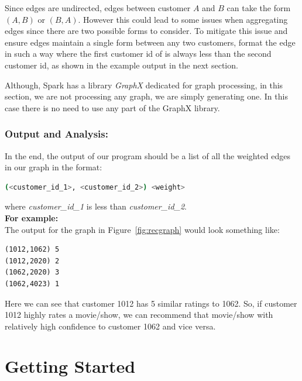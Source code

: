 \documentclass{article}
\begin{document}
\begin{info}
Since edges are undirected, edges between customer $A$ and $B$ can take the form $(A,B)$ or $(B,A)$. However this could lead to some issues when aggregating edges since there are two possible forms to consider. To mitigate this issue and ensure edges maintain a single form between any two customers, format the edge in such a way where the first customer id of is always less than the second customer id, as shown in the example output in the next section. 
\end{info}

\vspace{-0.5cm}

\begin{info}
Although, Spark has a library \textit{GraphX} dedicated for graph processing, in this section, we are not processing any graph, we are simply generating one. In this case there is no need to use any part of the GraphX library.
\end{info}



\subsubsection*{Output and Analysis:}
In the end, the output of our program should be a list of all the weighted edges in our graph in the format:
\begin{lstlisting}[language=bash]
                (<customer_id_1>, <customer_id_2>) <weight> 
\end{lstlisting}
where \textit{customer\_id\_1} is less than \textit{customer\_id\_2}.\\

\noindent \textbf{For example:}\\
The output for the graph in Figure~\ref{fig:recgraph} would look something like:
\begin{Verbatim}[frame=single]
(1012,1062) 5
(1012,2020) 2
(1062,2020) 3
(1062,4023) 1
\end{Verbatim}
Here we can see that customer 1012 has 5 similar ratings to 1062. So, if customer 1012 highly rates a movie/show, we can recommend that movie/show with relatively high confidence to customer 1062 and vice versa. 
\vspace{-0.1cm}

\section{Getting Started}
\end{document}
